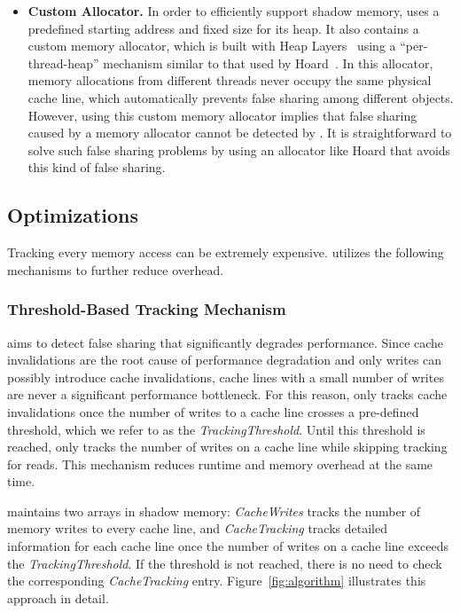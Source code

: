 \begin{itemize}
\item \textbf{Custom Allocator.} In order to efficiently support shadow memory, \Predator{} uses a predefined starting address and fixed size for its heap.  It also contains a custom memory allocator, which is built with Heap Layers~\cite{heaplayers} using a ``per-thread-heap'' mechanism similar to that used by Hoard~\cite{Hoard}.  In this allocator, memory allocations from different threads never occupy the same physical cache line, which automatically prevents false sharing among different objects.  However, using this custom memory allocator implies that false sharing caused by a memory allocator cannot be detected by \Predator{}. It is straightforward to solve such false sharing problems by using an allocator like Hoard that avoids this kind of false sharing.

\end{itemize} 
 
\subsection{Optimizations}
\label{optimization}
Tracking every memory access can be extremely expensive.  
\Predator{} utilizes the following mechanisms to further reduce overhead.

\subsubsection{Threshold-Based Tracking Mechanism}
\label{sec:thresholdtracking}
\Predator{} aims to detect false sharing that significantly degrades performance. Since cache invalidations are the root cause of performance degradation and only writes 
can possibly introduce cache invalidations, 
cache lines with a small number of writes are never a significant performance bottleneck.
For this reason, \Predator{} only tracks cache invalidations
once the number of writes to a cache line crosses a
pre-defined threshold, which we refer to as the {\it TrackingThreshold}. 
Until this threshold is reached, \Predator{} only tracks the number of writes on a cache line 
while skipping tracking for reads.
This mechanism reduces runtime and memory overhead
at the same time.

\Predator{} maintains two arrays in shadow memory: 
{\it CacheWrites} tracks the number of memory writes to every cache line, and
{\it CacheTracking} tracks detailed information 
for each cache line once the number of writes on a cache line exceeds
the {\it TrackingThreshold}. 
If the threshold is not reached, there is no need to check the corresponding {\it CacheTracking} entry. 
Figure~\ref{fig:algorithm} illustrates this approach in detail.

